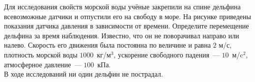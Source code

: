 Для исследования свойств морской воды учёные закрепили на спине дельфина всевозможные датчики и отпустили его на свободу в море. На рисунке приведены показания датчика давления в зависимости от времени. Определите перемещение дельфина за время наблюдения. Известно, что он не поворачивал направо или налево. Скорость его движения была постоянна по величине и равна  $2$ м/с, плотность морской воды $1000$~кг/м$^3$, ускорение свободного падения~--- $10$~м/c$^2$, атмосферное давление~--- $100$~кПа.\\
	В ходе исследований ни один дельфин не пострадал.